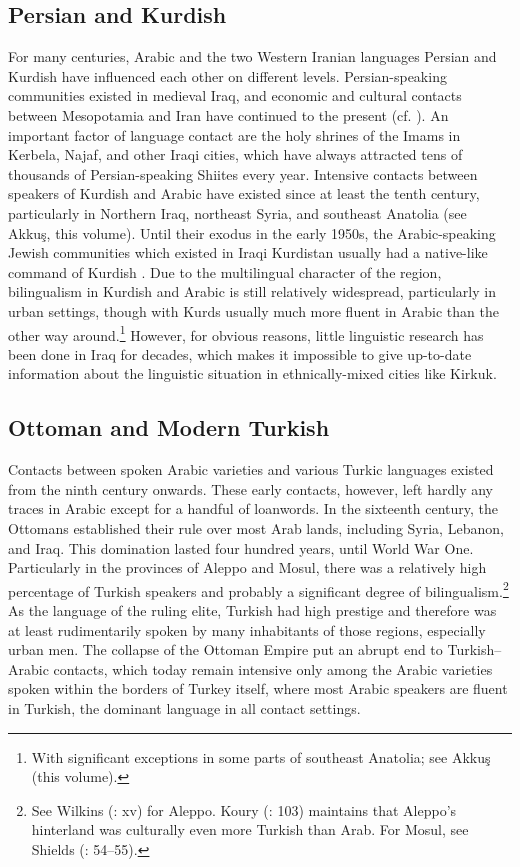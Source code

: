 \documentclass[output=paper]{langsci/langscibook}
\begin{document}
  \subsection{Persian and Kurdish} \label{persian} 
For many centuries, Arabic and the two Western Iranian languages Persian and Kurdish have influenced each other on different levels. Persian-speaking communities existed in medieval Iraq, and economic and cultural contacts between Mesopotamia and Iran have continued to the present (cf. \citealt{Gazsi2011}). An important factor of language contact are the holy shrines of the Imams in Kerbela, Najaf, and other Iraqi cities, which have always attracted tens of thousands of Persian-speaking Shiites every year. Intensive contacts between speakers of Kurdish and Arabic have existed since at least the tenth century, particularly in Northern Iraq, northeast Syria, and southeast Anatolia (see Akkuş, this volume). Until their exodus in the early 1950s, the Arabic-speaking Jewish communities which existed in Iraqi Kurdistan usually had a native-like command of Kurdish \citep[12]{Jastrow1990chapter}. Due to the multilingual character of the region, bilingualism in Kurdish and Arabic is still relatively widespread, particularly in urban settings, though with Kurds usually much more fluent in Arabic than the other way around.\footnote{With significant exceptions in some parts of southeast Anatolia; see Akkuş (this volume).} However, for obvious reasons, little linguistic research has been done in Iraq for decades, which makes it impossible to give up-to-date information about the linguistic situation in ethnically-mixed cities like Kirkuk.

 \subsection{Ottoman and Modern Turkish} 
Contacts between spoken Arabic varieties and various Turkic languages existed from the ninth century onwards. These early contacts, however, left hardly any traces in Arabic except for a handful of loanwords. In the sixteenth century, the Ottomans established their rule over most Arab lands, including Syria, Lebanon, and Iraq. This domination lasted four hundred years, until World War One. Particularly in the provinces of Aleppo and Mosul, there was a relatively high percentage of Turkish speakers and probably a significant degree of bilingualism.\footnote{See Wilkins (\citeyear{Wilkins2010}: xv) for Aleppo. Koury (\citeyear{Khoury1987}: 103) maintains that Aleppo’s hinterland was culturally even more Turkish than Arab. For Mosul, see Shields (\citeyear{Shields2004}: 54--55).} As the language of the ruling elite, Turkish had high prestige and therefore was at least rudimentarily spoken by many inhabitants of those regions, especially urban men. The collapse of the Ottoman Empire put an abrupt end to Turkish--Arabic contacts, which today remain intensive only among the Arabic varieties spoken within the borders of Turkey itself, where most Arabic speakers are fluent in Turkish, the dominant language in all contact settings.
\end{document}
